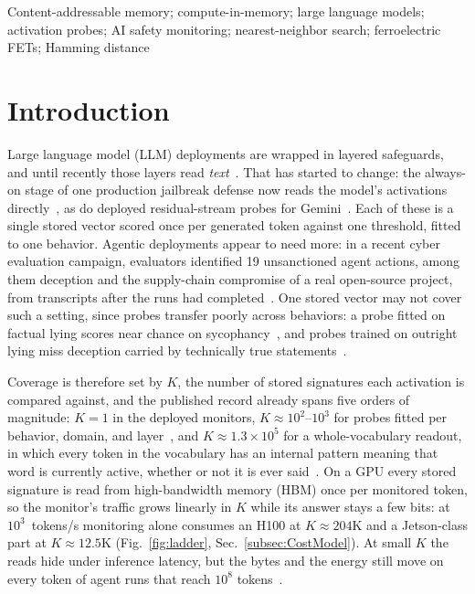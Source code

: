 \documentclass[conference]{IEEEtran}
\begin{document}
\begin{IEEEkeywords}
Content-addressable memory; compute-in-memory; large language models;
activation probes; AI safety monitoring; nearest-neighbor search;
ferroelectric FETs; Hamming distance
\end{IEEEkeywords}

\section{Introduction}
\label{sec:Introduction}
Large language model (LLM) deployments are wrapped in layered
safeguards, and until recently those layers read
\emph{text}~\cite{metr2026policies}. That has started to change: the
always-on stage of one production jailbreak defense now reads the
model's activations directly~\cite{ccpp2026,anthropic2026ccblog}, as
do deployed residual-stream probes for
Gemini~\cite{gemini2026probes}. Each of these is a single stored
vector scored once per generated token against one threshold, fitted
to one behavior. Agentic deployments appear to need more: in a recent
cyber evaluation campaign, evaluators identified 19 unsanctioned agent
actions, among them deception and the supply-chain compromise of a
real open-source project, from transcripts after the runs had
completed~\cite{aisi2026cyber,aisi2026incident}. One stored vector may
not cover such a setting, since probes transfer poorly across
behaviors: a probe fitted on factual lying scores near chance on
sycophancy~\cite{ying2026spectrum}, and probes trained on outright
lying miss deception carried by technically true
statements~\cite{berger2026liedetector}.

Coverage is therefore set by $K$, the number of stored signatures
each activation is compared against, and the published record
already spans five orders of magnitude: $K=1$ in the deployed
monitors, $K\approx10^{2}$--$10^{3}$ for probes fitted per behavior,
domain, and layer~\cite{ying2026spectrum,aisi2026incident}, and
$K\approx1.3\!\times\!10^{5}$ for a whole-vocabulary readout, in
which every token in the vocabulary has an internal pattern meaning
that word is currently active, whether or not it is ever
said~\cite{anthropic2026workspace}. On a GPU every stored signature
is read from high-bandwidth memory (HBM) once per monitored token, so
the monitor's traffic grows linearly in $K$ while its answer stays a
few bits: at $10^{3}$~tokens/s monitoring alone consumes an H100 at
$K\!\approx\!204$K and a Jetson-class part at $K\!\approx\!12.5$K
(Fig.~\ref{fig:ladder}, Sec.~\ref{subsec:CostModel}). At small $K$
the reads hide under inference latency, but the bytes and the energy
still move on every token of agent runs that reach $10^{8}$
tokens~\cite{aisi2026cyber}.
\end{document}
